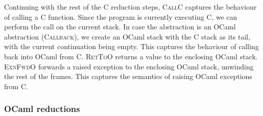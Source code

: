 \documentclass[sigplan,10pt,review,anonymous]{acmart}\settopmatter{printfolios=true,printccs=false,printacmref=false}
\begin{document}
Continuing with the rest of the C reduction steps, \textsc{CallC} captures the
behaviour of calling a C function. Since the program is currently executing C,
we can perform the call on the current stack. In case the abstraction is an
OCaml abstraction (\textsc{Callback}), we create an OCaml stack with the C
stack as its tail, with the current continuation being empty. This captures the
behaviour of calling back into OCaml from C. \textsc{RetToO} returns a value to
the enclosing OCaml stack. \textsc{ExnFwdO} forwards a raised exception to the
enclosing OCaml stack, unwinding the rest of the frames. This captures the
semantics of raising OCaml exceptions from C.

\subsubsection{OCaml reductions}
\end{document}
